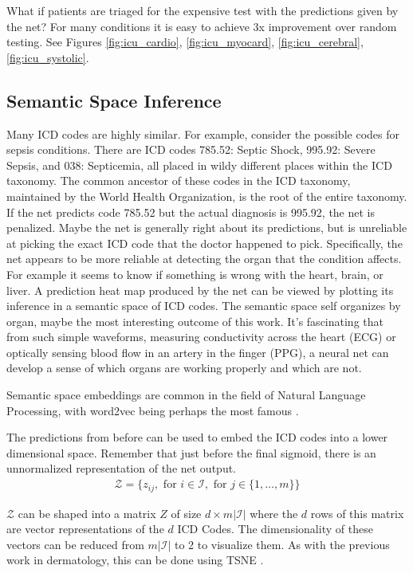 What if patients are triaged for the expensive test with the predictions given by the net?  For many conditions it is easy to achieve 3x improvement over random testing.  See Figures \ref{fig:icu_cardio}, \ref{fig:icu_myocard}, \ref{fig:icu_cerebral}, \ref{fig:icu_systolic}.

\subsection{Semantic Space Inference}

Many ICD codes are highly similar.  For example, consider the possible codes for sepsis conditions.  There are ICD codes 785.52: Septic Shock, 995.92: Severe Sepsis, and 038: Septicemia, all placed in wildy different places within the ICD taxonomy.  The common ancestor of these codes in the ICD taxonomy, maintained by the World Health Organization, is the root of the entire taxonomy.  If the net predicts code 785.52 but the actual diagnosis is 995.92, the net is penalized.  Maybe the net is generally right about its predictions, but is unreliable at picking the exact ICD code that the doctor happened to pick.  Specifically, the net appears to be more reliable at detecting the organ that the condition affects.  For example it seems to know if something is wrong with the heart, brain, or liver.  A prediction heat map produced by the net can be viewed by plotting its inference in a semantic space of ICD codes.  The semantic space self organizes by organ, maybe the most interesting outcome of this work.  It's fascinating that from such simple waveforms, measuring conductivity across the heart (ECG) or optically sensing blood flow in an artery in the finger (PPG), a neural net can develop a sense of which organs are working properly and which are not.

Semantic space embeddings are common in the field of Natural Language Processing, with word2vec being perhaps the most famous \cite{mikolov2013efficient}.

The predictions from before can be used to embed the ICD codes into a lower dimensional space. Remember that just before the final sigmoid, there is an unnormalized representation of the net output.
\begin{gather}
    \mathcal{Z} = \{
        z_{ij},
        \text{ for } i \in \mathcal{I},
        \text{ for } j \in \{ 1, \dots, m \}
    \}
\end{gather}

$\mathcal{Z}$ can be shaped into a matrix $Z$ of size $d \times m |\mathcal{I}|$ where the $d$ rows of this matrix are vector representations of the $d$ ICD Codes.  The dimensionality of these vectors can be reduced from $m |\mathcal{I}|$ to 2 to visualize them.  As with the previous work in dermatology, this can be done using TSNE \cite{van2008visualizing}.


